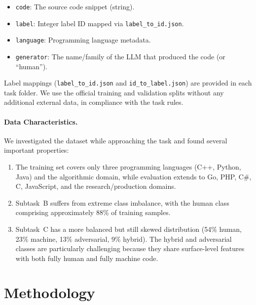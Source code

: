 \documentclass[11pt]{article}
\begin{document}
\begin{itemize}
    \item \texttt{code}: The source code snippet (string).
    \item \texttt{label}: Integer label ID mapped via \texttt{label\_to\_id.json}.
    \item \texttt{language}: Programming language metadata.
    \item \texttt{generator}: The name/family of the LLM that produced the code (or ``human'').
\end{itemize}

Label mappings (\texttt{label\_to\_id.json} and \texttt{id\_to\_label.json}) are provided in each task folder. We use the official training and validation splits without any additional external data, in compliance with the task rules.

\paragraph{Data Characteristics.} We investigated the dataset while approaching the task and found several important properties:
\begin{enumerate}
    \item The training set covers only three programming languages (C++, Python, Java) and the algorithmic domain, while evaluation extends to Go, PHP, C\#, C, JavaScript, and the research/production domains.
    \item Subtask~B suffers from extreme class imbalance, with the human class comprising approximately 88\% of training samples.
    \item Subtask~C has a more balanced but still skewed distribution (54\% human, 23\% machine, 13\% adversarial, 9\% hybrid). The hybrid and adversarial classes are particularly challenging because they share surface-level features with both fully human and fully machine code.
\end{enumerate}

\section{Methodology}
\label{sec:method}

\end{document}
